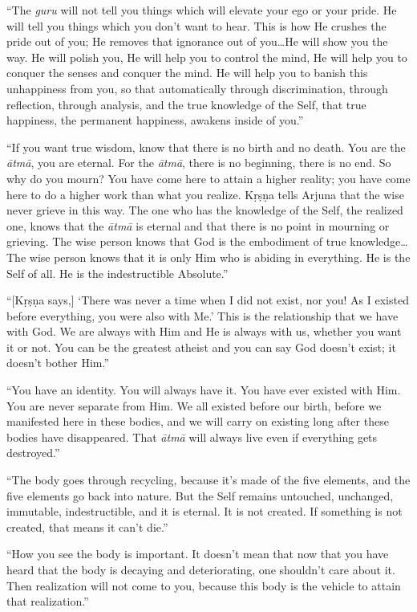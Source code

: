 \enquote{The \textit{guru} will not tell you things which will elevate your ego or your pride. He will tell you things which you don’t want to hear. This is how He crushes the pride out of you; He removes that ignorance out of you\ldots He will show you the way. He will polish you, He will help you to control the mind, He will help you to conquer the senses and conquer the mind. He will help you to banish this unhappiness from you, so that automatically through discrimination, through reflection, through analysis, and the true knowledge of the Self, that true happiness, the permanent happiness, awakens inside of you.}

\enquote{If you want true wisdom, know that there is no birth and no death. You are the \textit{ātmā}, you are eternal. For the \textit{ātmā}, there is no beginning, there is no end. So why do you mourn? You have come here to attain a higher reality; you have come here to do a higher work than what you realize. Kṛṣṇa tells Arjuna that the wise never grieve in this way. The one who has the knowledge of the Self, the realized one, knows that the \textit{ātmā} is eternal and that there is no point in mourning or grieving. The wise person knows that God is the embodiment of true knowledge\ldots The wise person knows that it is only Him who is abiding in everything. He is the Self of all. He is the indestructible Absolute.}

\enquote{[Kṛṣṇa says,] \enquote{There was never a time when I did not exist, nor you! As I existed before everything, you were also with Me.} This is the relationship that we have with God. We are always with Him and He is always with us, whether you want it or not. You can be the greatest atheist and you can say God doesn’t exist; it doesn’t bother Him.}

\enquote{You have an identity. You will always have it. You have ever existed with Him. You are never separate from Him. We all existed before our birth, before we manifested here in these bodies, and we will carry on existing long after these bodies have disappeared. That \textit{ātmā} will always live even if everything gets destroyed.}

\enquote{The body goes through recycling, because it’s made of the five elements, and the five elements go back into nature. But the Self remains untouched, unchanged, immutable, indestructible, and it is eternal. It is not created. If something is not created, that means it can’t die.}

\enquote{How you see the body is important. It doesn’t mean that now that you have heard that the body is decaying and deteriorating, one shouldn’t care about it. Then realization will not come to you, because this body is the vehicle to attain that realization.}

